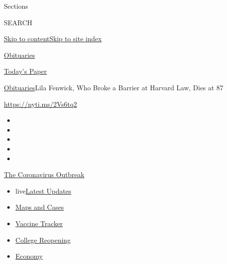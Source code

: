 Sections

SEARCH

\protect\hyperlink{site-content}{Skip to
content}\protect\hyperlink{site-index}{Skip to site index}

\href{https://www.nytimes3xbfgragh.onion/section/obituaries}{Obituaries}

\href{https://myaccount.nytimes3xbfgragh.onion/auth/login?response_type=cookie\&client_id=vi}{}

\href{https://www.nytimes3xbfgragh.onion/section/todayspaper}{Today's
Paper}

\href{/section/obituaries}{Obituaries}\textbar{}Lila Fenwick, Who Broke
a Barrier at Harvard Law, Dies at 87

\url{https://nyti.ms/2Vs6tq2}

\begin{itemize}
\item
\item
\item
\item
\item
\end{itemize}

\href{https://www.nytimes3xbfgragh.onion/news-event/coronavirus?action=click\&pgtype=Article\&state=default\&region=TOP_BANNER\&context=storylines_menu}{The
Coronavirus Outbreak}

\begin{itemize}
\tightlist
\item
  live\href{https://www.nytimes3xbfgragh.onion/2020/08/04/world/coronavirus-covid-19.html?action=click\&pgtype=Article\&state=default\&region=TOP_BANNER\&context=storylines_menu}{Latest
  Updates}
\item
  \href{https://www.nytimes3xbfgragh.onion/interactive/2020/us/coronavirus-us-cases.html?action=click\&pgtype=Article\&state=default\&region=TOP_BANNER\&context=storylines_menu}{Maps
  and Cases}
\item
  \href{https://www.nytimes3xbfgragh.onion/interactive/2020/science/coronavirus-vaccine-tracker.html?action=click\&pgtype=Article\&state=default\&region=TOP_BANNER\&context=storylines_menu}{Vaccine
  Tracker}
\item
  \href{https://www.nytimes3xbfgragh.onion/2020/08/02/us/covid-college-reopening.html?action=click\&pgtype=Article\&state=default\&region=TOP_BANNER\&context=storylines_menu}{College
  Reopening}
\item
  \href{https://www.nytimes3xbfgragh.onion/live/2020/08/03/business/stock-market-today-coronavirus?action=click\&pgtype=Article\&state=default\&region=TOP_BANNER\&context=storylines_menu}{Economy}
\end{itemize}

